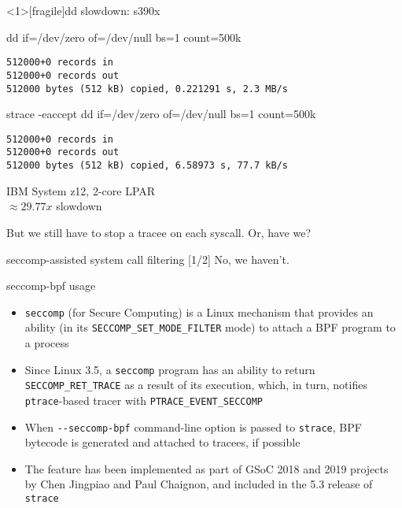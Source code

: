\documentclass[unicode]{beamer}
\begin{document}
\begin{frame}<1>[fragile]{dd slowdown: s390x}
\begin{block}{\large dd if=/dev/zero of=/dev/null bs=1 count=500k}
\begin{verbatim}
512000+0 records in
512000+0 records out
512000 bytes (512 kB) copied, 0.221291 s, 2.3 MB/s
\end{verbatim}
\end{block}
\begin{block}{\large strace -eaccept dd if=/dev/zero of=/dev/null bs=1 count=500k}
\begin{verbatim}
512000+0 records in
512000+0 records out
512000 bytes (512 kB) copied, 6.58973 s, 77.7 kB/s
\end{verbatim}
\end{block}
\begin{scriptsize}
IBM System z12, 2-core LPAR \\
$\approx 29.77x$ slowdown \\
\end{scriptsize}
\pause
But we still have to stop a tracee on each syscall. Or, have we?
\end{frame}



\begin{frame}{seccomp-assisted system call filtering \hfill [1/2]}
No, we haven't.
\pause
\begin{block}{\large seccomp-bpf usage}
\begin{itemize}
  \item \texttt{seccomp} (for Secure Computing) is a Linux mechanism
        that provides an ability (in its \texttt{SECCOMP\_SET\_MODE\_FILTER}
        mode) to attach a BPF program to a process
  \item Since Linux 3.5, a \texttt{seccomp} program has an ability
        to return \texttt{SECCOMP\_RET\_TRACE} as a result of its execution,
        which, in turn, notifies \texttt{ptrace}-based tracer with
        \texttt{PTRACE\_EVENT\_SECCOMP}
  \item When \texttt{-{}-seccomp-bpf} command-line option is passed
        to \texttt{strace}, BPF bytecode is generated and attached to tracees,
        if possible
  \item The feature has been implemented as part of GSoC 2018 and 2019 projects
        by Chen Jingpiao and Paul Chaignon, and included
        in the 5.3 release of \texttt{strace}
\end{itemize}
\end{block}
\end{frame}
\end{document}

